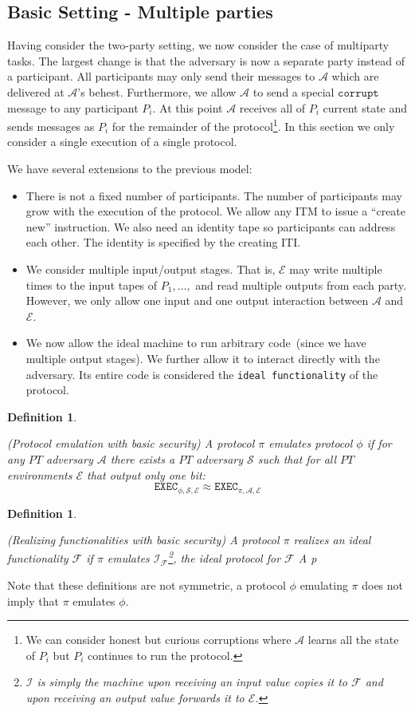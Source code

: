 \documentclass{article}
\newtheorem{defn}[thm]{Definition}
\newenvironment{definition}{\begin{defn}\begin{em}}%
{\end{em}\end{defn}}
\begin{document}
\subsection{Basic Setting - Multiple parties}
Having consider the two-party setting, we now consider the case of multiparty tasks.  The largest change is that the adversary is now a separate party instead of a participant.  All participants may only send their messages to $\mathcal{A}$ which are delivered at $\mathcal{A}$'s behest.  Furthermore, we allow $\mathcal{A}$ to send a special $\mathtt{corrupt}$ message to any participant $P_i$.  At this point $\mathcal{A}$ receives all of $P_i$ current state and sends messages as $P_i$ for the remainder of the protocol\footnote{We can consider honest but curious corruptions where $\mathcal{A}$ learns all the state of $P_i$ but $P_i$ continues to run the protocol.}.  In this section we only consider a single execution of a single protocol.

We have several extensions to the previous model:
\begin{itemize}
\item There is not a fixed number of participants.  The number of participants may grow with the execution of the protocol.  We allow any ITM to issue a ``create new'' instruction.  We also need an identity tape so participants can address each other.  The identity is specified by the creating ITI.
\item We consider multiple input/output stages.  That is, $\mathcal{E}$ may write multiple times to the input tapes of $P_1,..., $ and read multiple outputs from each party.  However, we only allow one input and one output interaction between $\mathcal{A}$ and $\mathcal{E}$.
\item We now allow the ideal machine to run arbitrary code~(since we have multiple output stages).  We further allow it to interact directly with the adversary.  Its entire code is considered the \texttt{ideal functionality} of the protocol.
\end{itemize}
\begin{definition}(Protocol emulation with basic security)  A protocol $\pi$ emulates protocol $\phi$ if for any $PT$ adversary $\mathcal{A}$ there exists a $PT$ adversary $\mathcal{S}$ such that for all $PT$ environments $\mathcal{E}$ that output only one bit:
\[
\mathtt{EXEC}_{\phi, \mathcal{S, E}}\approx\mathtt{EXEC}_{\pi, \mathcal{A, E}}
\]
\end{definition}
\begin{definition}(Realizing functionalities with basic security) A protocol $\pi$ realizes an ideal functionality $\mathcal{F}$ if $\pi$ emulates $\mathcal{I_F}$\footnote{$\mathcal{I}$ is simply the machine upon receiving an input value copies it to $\mathcal{F}$ and upon receiving an output value forwards it to $\mathcal{E}$.}, the ideal protocol for $\mathcal{F}$
A p
\end{definition}
Note that these definitions are not symmetric, a protocol $\phi$ emulating $\pi$ does not imply that $\pi$ emulates $\phi$.
\end{document}
